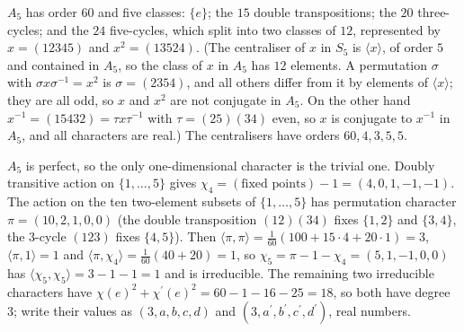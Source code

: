 \begin{example}\label{representation-theory:example-character-table-a5}
$A_5$ has order $60$ and five classes: $\{e\}$; the $15$ double transpositions; the $20$ three-cycles; and the $24$ five-cycles, which split into two classes of $12$, represented by
$x = (12345)$ and $x^2 = (13524)$. (The centraliser of $x$ in $S_5$ is $\langle x\rangle$, of order $5$ and contained in $A_5$, so the class of $x$ in $A_5$ has $12$ elements. A
permutation $\sigma$ with $\sigma x\sigma^{-1} = x^2$ is $\sigma = (2354)$, and all others differ from it by elements of $\langle x\rangle$; they are all odd, so $x$ and $x^2$ are not conjugate in
$A_5$. On the other hand $x^{-1} = (15432) = \tau x\tau^{-1}$ with $\tau = (25)(34)$ even, so $x$ is conjugate to $x^{-1}$ in $A_5$, and all characters are real.) The centralisers have orders
$60, 4, 3, 5, 5$.

$A_5$ is perfect, so the only one-dimensional character is the trivial one. Doubly transitive action on $\{1, \ldots, 5\}$ gives $\chi_4 = (\text{fixed points}) - 1 = (4, 0, 1, -1, -1)$.
The action on the ten two-element subsets of $\{1, \ldots, 5\}$ has permutation character $\pi = (10, 2, 1, 0, 0)$ (the double transposition $(12)(34)$ fixes $\{1, 2\}$ and $\{3, 4\}$,
the $3$-cycle $(123)$ fixes $\{4, 5\}$). Then $\langle\pi, \pi\rangle = \frac{1}{60}(100 + 15 \cdot 4 + 20 \cdot 1) = 3$, $\langle\pi, 1\rangle = 1$ and $\langle\pi, \chi_4\rangle = \frac{1}{60}(40 + 20) = 1$, so
$\chi_5 = \pi - 1 - \chi_4 = (5, 1, -1, 0, 0)$ has $\langle\chi_5, \chi_5\rangle = 3 - 1 - 1 = 1$ and is irreducible. The remaining two irreducible characters have
$\chi(e)^2 + \chi^{\prime}(e)^2 = 60 - 1 - 16 - 25 = 18$, so both have degree $3$; write their values as $(3, a, b, c, d)$ and $(3, a^{\prime}, b^{\prime}, c^{\prime}, d^{\prime})$, real numbers.


\end{example}
